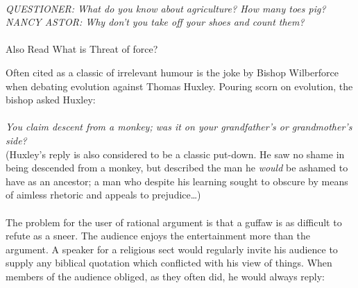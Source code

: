\documentclass[a4paper,12pt,single,pdftex]{scrartcl}
\begin{document}
    
       
    \\

    
      {\em QUESTIONER: What do you know about agriculture? How many toes pig?}
    \\

    
      {\em NANCY ASTOR: Why don’t you take off your shoes and count them?}
    \\

    
       
    \\

    
      

      
        Also Read  What is Threat of force?
      
    
    
      Often cited as a classic of irrelevant humour is the joke by Bishop Wilberforce when debating evolution against Thomas Huxley. Pouring scorn on evolution, the bishop asked Huxley:
    \\

    
       
    \\

    
      {\em You claim descent from a monkey; was it on your grandfather’s or grandmother’s side?}
    \\

    
      (Huxley’s reply is also considered to be a classic put-down. He saw no shame in being descended from a monkey, but described the man he {\em would }be ashamed to have as an ancestor; a man who despite his learning sought to obscure by means of aimless rhetoric and appeals to prejudice…)
    \\

    
       
    \\

    
      The problem for the user of rational argument is that a guffaw is as difficult to refute as a sneer. The audience enjoys the entertainment more than the argument. A speaker for a religious sect would regularly invite his audience to supply any biblical quotation which conflicted with his view of things. When members of the audience obliged, as they often did, he would always reply:
    \\

    
       
    \\
\end{document}

